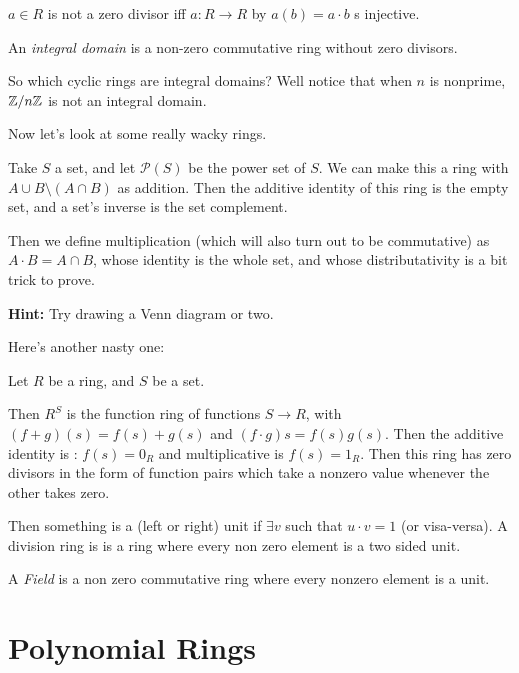 \documentclass[12pt, twosided]{article}
\begin{document}
\begin{prop}
  \(a \in R\) is not a zero divisor iff \(a:R \to R\) by \(a(b) = a \cdot b\) s injective.
\end{prop}


\begin{df}
  An \textit{integral domain} is a non-zero commutative ring without zero divisors.
\end{df}

So which cyclic rings are integral domains? Well notice that when \(n\) is nonprime, \(\mathbb{Z}/n\mathbb{Z}\) is not an integral domain.

Now let's look at some really wacky rings.

\begin{exa}
  Take \(S\) a set, and let \(\mathcal{P}(S)\) be the power set of \(S\). We can make this a ring with \(A \cup B \setminus (A \cap B)\) as addition. Then the additive identity of this ring is the empty set, and a set's inverse is the set complement.

  Then we define multiplication (which will also turn out to be commutative) as \(A \cdot B = A \cap B\), whose identity is the whole set, and whose distributativity is a bit trick to prove.

  \textbf{Hint:} Try drawing a Venn diagram or two.
\end{exa}

Here's another nasty one:

\begin{exa}
  Let \(R\) be a ring, and \(S\) be a set.

  Then \(R^S\) is the function ring of functions \(S \to R\), with \((f + g)(s) = f(s) + g(s)\) and \((f \cdot g)s = f(s)g(s)\). Then the additive identity is : \(f(s) = 0_R\) and multiplicative is \(f(s) = 1_R\). Then this ring has zero divisors in the form of function pairs which take a nonzero value whenever the other takes zero.
\end{exa}

Then something is a (left or right) unit if \(\exists v\) such that \(u \cdot v = 1\) (or visa-versa). A division ring is is a ring where every non zero element is a two sided unit.

\begin{df}
  A \textit{Field} is a non zero commutative ring where every nonzero element is a unit.
\end{df}

\section{Polynomial Rings}
\end{document}
